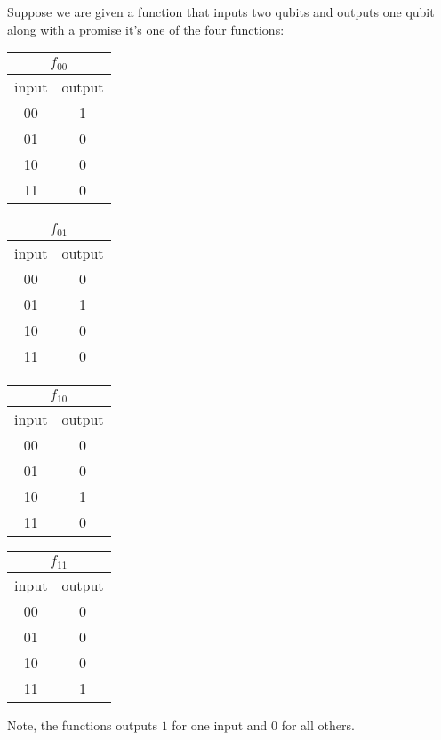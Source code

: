 \documentclass[12pt,twoside,a4paper]{article}
\begin{document}
Suppose we are given a function that inputs two qubits and outputs one qubit along with a promise it's one of the four functions:
\begin{center}
        \begin{tabular}[t]{|c|c|}
                \hline
                \multicolumn{2}{|c|}{$f_{00}$} \\
                \hline
                input & output \\
                \hline
                00 & 1 \\
                01 & 0 \\
                10 & 0 \\
                11 & 0 \\
                \hline
        \end{tabular}
        \begin{tabular}[t]{|c|c|}
                \hline
                \multicolumn{2}{|c|}{$f_{01}$} \\
                \hline
                input & output \\
                \hline
                00 & 0 \\
                01 & 1 \\
                10 & 0 \\
                11 & 0 \\
                \hline
        \end{tabular}
        \begin{tabular}[t]{|c|c|}
                \hline
                \multicolumn{2}{|c|}{$f_{10}$} \\
                \hline
                input & output \\
                \hline
                00 & 0 \\
                01 & 0 \\
                10 & 1 \\
                11 & 0 \\
                \hline
        \end{tabular}
        \begin{tabular}[t]{|c|c|}
                \hline
                \multicolumn{2}{|c|}{$f_{11}$} \\
                \hline
                input & output \\
                \hline
                00 & 0 \\
                01 & 0 \\
                10 & 0 \\
                11 & 1 \\
                \hline
        \end{tabular}
\end{center}
Note, the functions outputs $1$ for one input and $0$ for all others.
\end{document}
